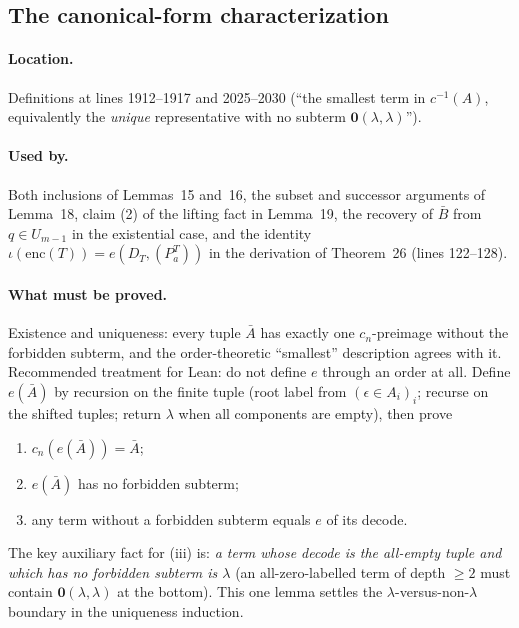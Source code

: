 \documentclass[11pt]{article}
\newcommand{\enc}{\mathrm{enc}}
\begin{document}
\subsection{The canonical-form characterization}
\label{sec:canonical}

\paragraph{Location.} Definitions at lines 1912--1917 and 2025--2030
(``the smallest term in \(c^{-1}(A)\), equivalently the \emph{unique}
representative with no subterm \(\mathbf 0(\lambda,\lambda)\)'').

\paragraph{Used by.} Both inclusions of Lemmas~15 and~16, the subset and
successor arguments of Lemma~18, claim (2) of the lifting fact in Lemma~19,
the recovery of \(\bar B\) from \(q\in U_{m-1}\) in the existential case, and
the identity \(\iota(\enc(T))=e(D_T,(P_a^T))\) in the derivation of
Theorem~26 (lines 122--128).

\paragraph{What must be proved.} Existence and uniqueness: every tuple
\(\bar A\) has exactly one \(c_n\)-preimage without the forbidden subterm, and
the order-theoretic ``smallest'' description agrees with it.  Recommended
treatment for Lean: do not define \(e\) through an order at all.  Define
\(e(\bar A)\) by recursion on the finite tuple (root label from
\((\epsilon\in A_i)_i\); recurse on the shifted tuples; return \(\lambda\) when
all components are empty), then prove
\begin{enumerate}[label=(\roman*),leftmargin=*]
  \item \(c_n(e(\bar A))=\bar A\);
  \item \(e(\bar A)\) has no forbidden subterm;
  \item any term without a forbidden subterm equals \(e\) of its decode.
\end{enumerate}
The key auxiliary fact for (iii) is:
\emph{a term whose decode is the all-empty tuple and which has no forbidden
subterm is \(\lambda\)} (an all-zero-labelled term of depth \(\ge2\) must
contain \(\mathbf 0(\lambda,\lambda)\) at the bottom).  This one lemma settles
the \(\lambda\)-versus-non-\(\lambda\) boundary in the uniqueness induction.
\end{document}
